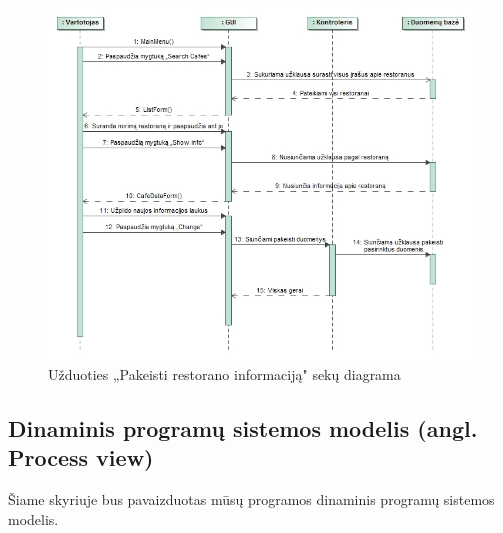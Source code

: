 \documentclass{VUMIFPSkursinis}
\begin{document}
{{{{{%
\begin{figure}[H]
	\centering
	\includegraphics[width=\textwidth,height=\textheight,keepaspectratio]{img/ChangeInfo}
	\caption{Užduoties „Pakeisti restorano informaciją" sekų diagrama}
	\label{img:ChangeInfo}
\end{figure}

\subsection{Dinaminis programų sistemos modelis (angl. Process view)}
Šiame skyriuje bus pavaizduotas mūsų programos dinaminis programų sistemos modelis.
}}}}}
\end{document}
